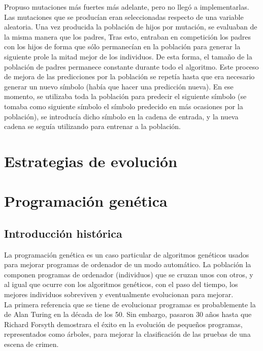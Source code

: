 \documentclass[12pt]{article} \usepackage[utf8x]{inputenc}
\begin{document}
Propuso mutaciones más fuertes más adelante, pero no llegó a
implementarlas. Las mutaciones que se producían eran seleccionadas
respecto de una variable aleatoria. Una vez producida la población de
hijos por mutación, se evaluaban de la misma manera que los padres,
Tras esto, entraban en competición los padres con los hijos de forma
que sólo permanecían en la población para generar la siguiente prole
la mitad mejor de los individuos. De esta forma, el tamaño de la
población de padres permanece constante durante todo el algoritmo.
Este proceso de mejora de las predicciones por la población se repetía
hasta que era necesario generar un nuevo símbolo (había que hacer una
predicción nueva). En ese momento, se utilizaba toda la población para
predecir el siguiente símbolo (se tomaba como siguiente símbolo el
símbolo predecido en más ocasiones por la población), se introducía
dicho símbolo en la cadena de entrada, y la nueva cadena se seguía
utilizando para entrenar a la población.

\section{Estrategias de evolución}

\section{Programación genética}


\subsection{Introducción histórica}


La programación genética es un caso particular de algoritmos genéticos
usados para mejorar programas de ordenador de un modo automático.  La
población la componen programas de ordenador (individuos) que se
cruzan unos con otros, y al igual que ocurre con los algoritmos
genéticos, con el paso del tiempo, los mejores individuos sobreviven
y eventualmente evolucionan para mejorar. \\

La primera referencia que se tiene de evolucionar programas es
probablemente la de Alan Turing en la década de los 50. Sin embargo,
pasaron 30 años hasta que Richard Forsyth demostrara el éxito en la
evolución de pequeños programas, representados como árboles,
para mejorar la clasificación de las pruebas de una escena de crimen.\\
\end{document}
